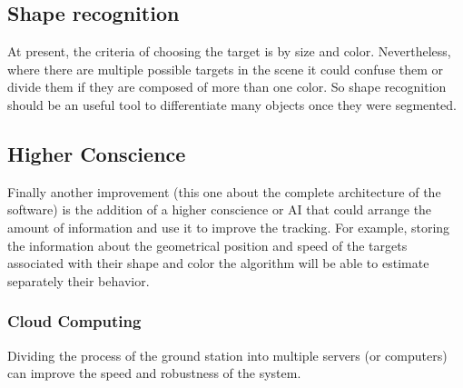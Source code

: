 	\subsection{Shape recognition}
	At present, the criteria of choosing the target is by size and color. Nevertheless, where there are multiple possible targets in the scene it could confuse them or divide them if they are composed of more than one color. So shape recognition should be an useful tool to differentiate many objects once they were segmented.
	
	
		
	\subsection{Higher Conscience}
	Finally another improvement (this one about the complete architecture of the software) is the addition of a higher conscience or AI that could arrange the amount of information and use it to improve the tracking.
	For example, storing the information about the geometrical position and speed of the targets associated with their shape and color the algorithm will be able to estimate separately their behavior.
	
	
		
		
	\subsubsection{Cloud Computing}
	Dividing the process of the ground station into multiple servers (or computers) can improve the speed and robustness of the system. 
	
	
